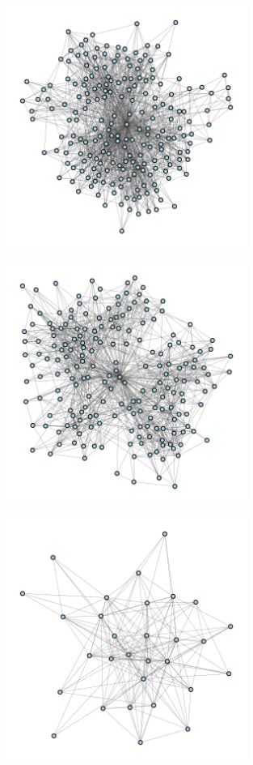 \documentclass[12pt]{article}
\begin{document}
\begin{appendix}
\begin{figure}
  \includegraphics[width=0.7\textwidth]{../3_results/town_2.png} \\
\end{figure}
\begin{figure}
  \centering
  \caption{\protect}
  \includegraphics[width=0.7\textwidth]{../3_results/town_3.png} \\
\end{figure}
\begin{figure}
  \centering
  \caption{\protect}
  \includegraphics[width=0.7\textwidth]{../3_results/town_4.png} \\

\end{figure}
\end{appendix}
\end{document}
